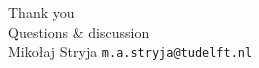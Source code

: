 \documentclass[aspectratio=169, 10pt]{beamer}
\begin{document}
\begin{frame}[plain]
  \begin{center}
    \vspace{2cm}
    {\Huge\color{tudelft} Thank you}\\[12pt]
    {\large Questions \& discussion}\\[20pt]
    {\small Mikołaj Stryja \textbar{} \texttt{m.a.stryja@tudelft.nl}}
  \end{center}
\end{frame}
\end{document}
